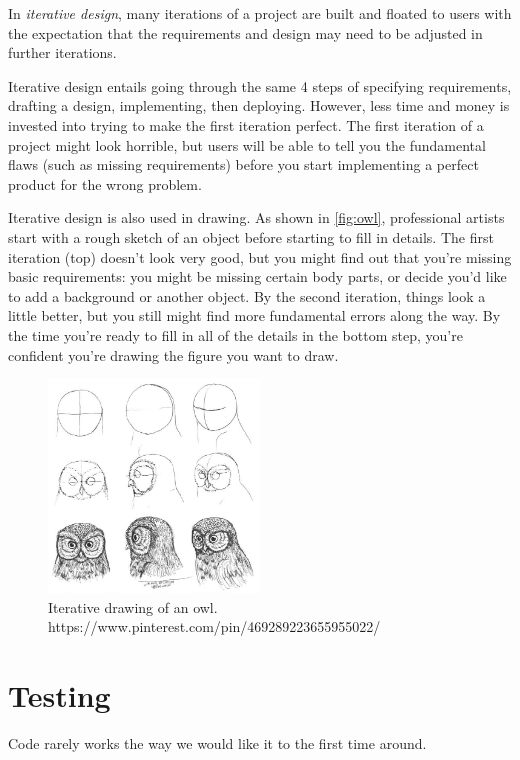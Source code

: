 \begin{definition}
In \emph{iterative design}, many iterations of a project are built and floated to users with the expectation that the requirements and design may need to be adjusted in further iterations. 
\end{definition}

Iterative design entails going through the same 4 steps of specifying requirements, drafting a design, implementing, then deploying. However, less time and money is invested into trying to make the first iteration perfect. The first iteration of a project might look horrible, but users will be able to tell you the fundamental flaws (such as missing requirements) before you start implementing a perfect product for the wrong problem. 

Iterative design is also used in drawing. As shown in \autoref{fig:owl}, professional artists start with a rough sketch of an object before starting to fill in details. The first iteration (top) doesn't look very good, but you might find out that you're missing basic requirements: you might be missing certain body parts, or decide you'd like to add a background or another object. By the second iteration, things look a little better, but you still might find more fundamental errors along the way. By the time you're ready to fill in all of the details in the bottom step, you're confident you're drawing the figure you want to draw. 

\begin{figure}
	\centering
	\includegraphics[width=0.5\textwidth]{images/owl.jpg}
	\caption{Iterative drawing of an owl. https://www.pinterest.com/pin/469289223655955022/}
	\label{fig:owl}
\end{figure}

\section{Testing}
Code rarely works the way we would like it to the first time around. 

